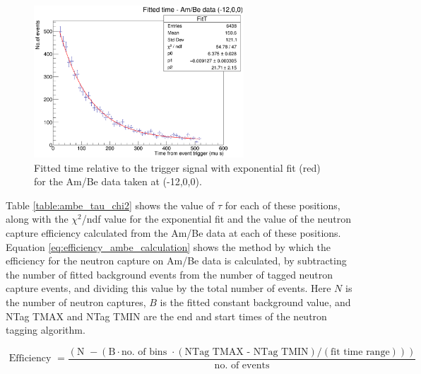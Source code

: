 \begin{figure}
    \centering
    \includegraphics[width=0.7\textwidth]{Figures/ambe_data_-12x.png}
    \caption{Fitted time relative to the trigger signal with exponential fit (red) for the Am/Be data taken at (-12,0,0).}
    \label{fig:ambe_-12}
\end{figure}

Table \ref{table:ambe_tau_chi2} shows the value of $\tau$ for each of these positions, along with the $\chi^{2}$/ndf value for the exponential fit and the value of the neutron capture efficiency calculated from the Am/Be data at each of these positions. Equation \ref{eq:efficiency_ambe_calculation} shows the method by which the efficiency for the neutron capture on Am/Be data is calculated, by subtracting the number of fitted background events from the number of tagged neutron capture events, and dividing this value by the total number of events. Here $N$ is the number of neutron captures, $B$ is the fitted constant background value, and NTag TMAX and NTag TMIN are the end and start times of the neutron tagging algorithm.   





\begin{equation}
    \text { Efficiency }=\frac{(\text {N } - (\text{B} \cdot \text {no. of bins }  \cdot (\text{NTag TMAX - NTag TMIN}) / (\text{fit time range})))  }{\text { no. of events }}
    \label{eq:efficiency_ambe_calculation}
\end{equation}

